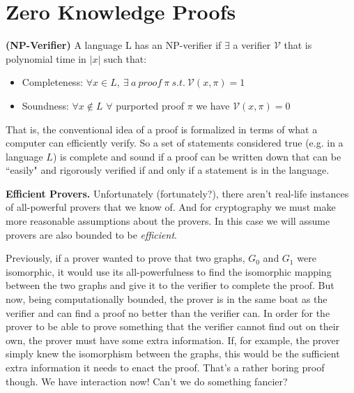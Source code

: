 

\section{Zero Knowledge Proofs}


\begin{definition} {\normalfont\textbf{(NP-Verifier)}} A language L has an NP-verifier if $\exists$ a verifier $\mathcal{V}$ that is polynomial time in $|x|$ such that:
		\begin{itemize}
			\item Completeness: $\forall x\in L,\ \exists\ a\ proof\ \pi\ s.t.\ \mathcal{V}(x,\pi)=1$
			\item Soundness: $\forall x \notin L$ $\forall$ purported proof $\pi$ we have $\mathcal{V}(x,\pi)=0$
		\end{itemize}
  \end{definition}

		That is, the conventional idea of a proof is formalized in terms of what a computer can efficiently verify.  So a set of statements considered true (e.g. in a language $L$) is complete and sound if a proof can be written down that can be ``easily" and rigorously verified if and only if a statement is in the language.


\bigskip
\noindent\textbf{Efficient Provers.}
		Unfortunately (fortunately?), there aren't real-life instances of all-powerful provers that we know of.  And for cryptography we must make more reasonable assumptions about the provers.  In this case we will assume provers are also bounded to be \emph{efficient}.
		
		Previously, if a prover wanted to prove that two graphs, $G_0$ and $G_1$ were isomorphic, it would use its all-powerfulness to find the isomorphic mapping between the two graphs and give it to the verifier to complete the proof.  But now, being computationally bounded, the prover is in the same boat as the verifier and can find a proof no better than the verifier can.  In order for the prover to be able to prove something that the verifier cannot find out on their own, the prover must have some extra information.  If, for example, the prover simply knew the isomorphism between the graphs, this would be the sufficient extra information it needs to enact the proof.  That's a rather boring proof though.  We have interaction now!  Can't we do something fancier?
		
